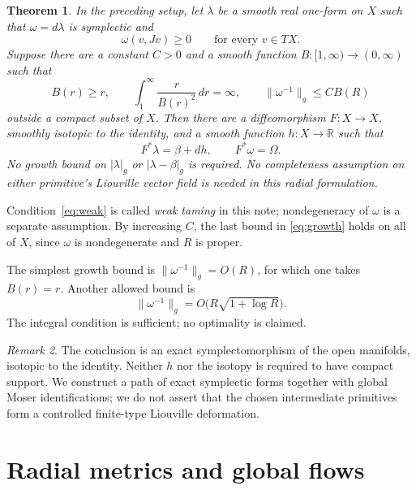 \documentclass[11pt,a4paper]{article}
\newtheorem{theorem}{Theorem}[section]
\theoremstyle{remark}
\newtheorem{remark}[theorem]{Remark}
\newcommand{\R}{\mathbb R}
\newcommand{\abs}[1]{\lvert #1\rvert}
\newcommand{\norm}[1]{\lVert #1\rVert}
\numberwithin{equation}{section}
\begin{document}
\begin{theorem}\label{thm:main}
In the preceding setup, let $\lambda$ be a smooth real one-form on $X$ such that $\omega=d\lambda$ is symplectic and
\begin{equation}\label{eq:weak}
\omega(v,Jv)\ge0\qquad\text{for every }v\in TX.
\end{equation}
Suppose there are a constant $C>0$ and a smooth function $B:[1,\infty)\to(0,\infty)$ such that
\begin{equation}\label{eq:growth}
B(r)\ge r,\qquad
\int_1^\infty\frac{r}{B(r)^2}\,dr=\infty,
\qquad \norm{\omega^{-1}}_g\le C B(R)
\end{equation}
outside a compact subset of $X$.
Then there are a diffeomorphism $F:X\to X$, smoothly isotopic to the identity, and a smooth function $h:X\to\R$ such that
\begin{equation}\label{eq:conclusion}
F^*\lambda=\beta+dh,
\qquad F^*\omega=\Omega.
\end{equation}
No growth bound on $\abs{\lambda}_g$ or $\abs{\lambda-\beta}_g$ is required. No completeness assumption on either primitive's Liouville vector field is needed in this radial formulation.
\end{theorem}

Condition~\eqref{eq:weak} is called \emph{weak taming} in this note; nondegeneracy of $\omega$ is a separate assumption. By increasing $C$, the last bound in \eqref{eq:growth} holds on all of $X$, since $\omega$ is nondegenerate and $R$ is proper.

The simplest growth bound is $\norm{\omega^{-1}}_g=O(R)$, for which one takes $B(r)=r$. Another allowed bound is
\[
\norm{\omega^{-1}}_g=O\bigl(R\sqrt{1+\log R}\bigr).
\]
The integral condition is sufficient; no optimality is claimed.

\begin{remark}\label{rem:scope}
The conclusion is an exact symplectomorphism of the open manifolds, isotopic to the identity. Neither $h$ nor the isotopy is required to have compact support. We construct a path of exact symplectic forms together with global Moser identifications; we do not assert that the chosen intermediate primitives form a controlled finite-type Liouville deformation.
\end{remark}

\section{Radial metrics and global flows}
\end{document}
